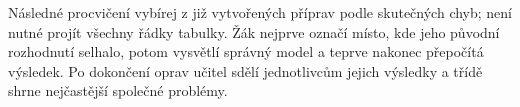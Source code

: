 \documentclass[11pt,a4paper]{article}
\begin{document}
Následné procvičení vybírej z již vytvořených příprav podle skutečných chyb; není nutné projít všechny řádky tabulky. Žák nejprve označí místo, kde jeho původní rozhodnutí selhalo, potom vysvětlí správný model a teprve nakonec přepočítá výsledek. Po dokončení oprav učitel sdělí jednotlivcům jejich výsledky a třídě shrne nejčastější společné problémy.

\end{document}
